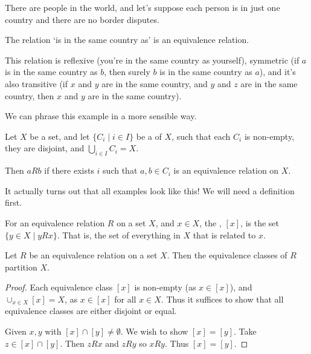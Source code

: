 \documentclass[a4paper]{scrreprt}
\begin{document}
\begin{example}
\begin{center}
\begin{tikzpicture}[x=0.75pt,y=0.75pt,yscale=-1,xscale=1]
\end{tikzpicture}

	\end{center}

	There are people in the world, and let's suppose each person is in just one country and there are no border disputes.

	The relation `is in the same country as' is an equivalence relation. 
	
	This relation is reflexive (you're in the same country as yourself), symmetric (if $a$ is in the same country as $b$, then surely $b$ is in the same country as $a$), and it's also transitive (if $x$ and $y$ are in the same country, and $y$ and $z$ are in the same country, then $x$ and $y$ are in the same country).
\end{example}


We can phrase this example in a more sensible way.

\begin{example}
	Let $X$ be a set, and let $\{C_i \mid i \in I \}$ be a  of $X$, such that each $C_i$ is non-empty, they are disjoint, and $\bigcup_{i \in I} C_i = X$.

	Then $a R b$ if there exists $i$ such that $a, b \in C_i$ is an equivalence relation on $X$.
\end{example}

It actually turns out that all examples look like this! We will need a definition first.

\begin{definition}
	For an equivalence relation $R$ on a set $X$, and $x \in X$, the , $[x]$, is the set $\{y \in X \mid y R x \}$. That is, the set of everything in $X$ that is related to $x$.
\end{definition}

\begin{proposition}
	Let $R$ be an equivalence relation on a set $X$. Then the equivalence classes of $R$ partition $X$.
\end{proposition}
\begin{proof}
	Each equivalence class $[x]$ is non-empty (as $x \in [x]$), and $\cup_{x \in X} [x] = X$, as $x \in [x]$ for all $x \in X$. Thus it suffices to show that all equivalence classes are either disjoint or equal.

	Given $x, y$ with $[x] \cap [y] \neq \emptyset$. We wish to show $[x] = [y]$. Take $z \in [x] \cap [y]$. Then $z R x$ and $z R y$ so $x R y$. Thus $[x] = [y]$.
\end{proof}
\end{document}
